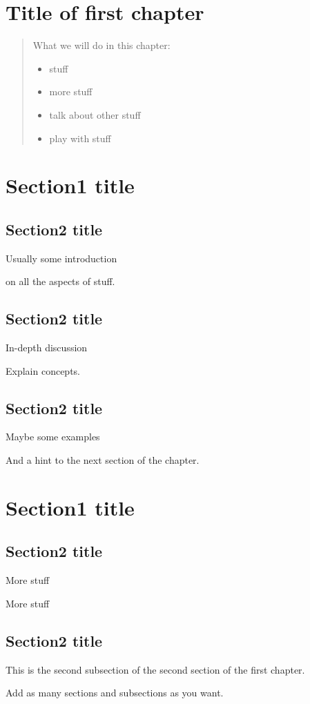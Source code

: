 \section{Title of first chapter}\label{chapux5f01}

\begin{quote}
What we will do in this chapter:

\begin{itemize}
\item
  stuff
\item
  more stuff
\item
  talk about other stuff
\item
  play with stuff
\end{itemize}
\end{quote}

\section{Section1 title}\label{sectux5f01ux5f01}

\subsection{Section2 title}\label{sectux5f01ux5f01ux5f01}

Usually some introduction

on all the aspects of stuff.

\subsection{Section2 title}\label{sectux5f01ux5f01ux5f02}

In-depth discussion

Explain concepts.

\subsection{Section2 title}\label{sectux5f01ux5f01ux5f03}

Maybe some examples

And a hint to the next section of the chapter.

\section{Section1 title}\label{sectux5f01ux5f02}

\subsection{Section2 title}\label{sectux5f01ux5f02ux5f01}

More stuff

More stuff

\subsection{Section2 title}\label{sectux5f01ux5f02ux5f02}

This is the second subsection of the second section of the first
chapter.

Add as many sections and subsections as you want.
